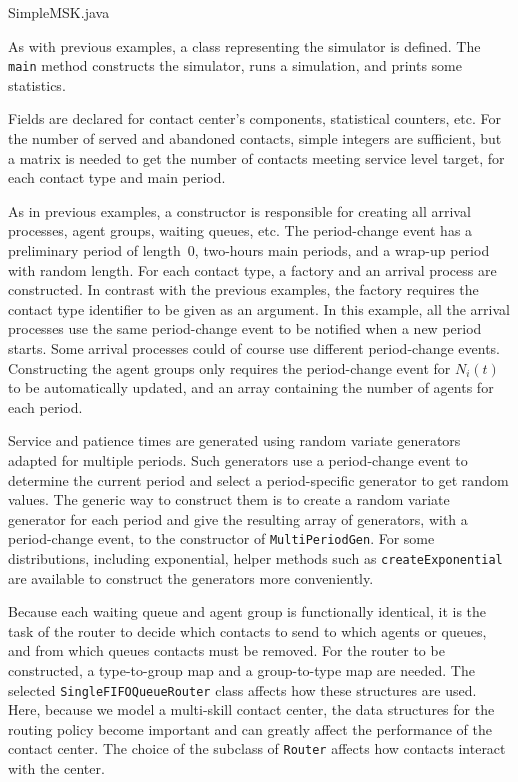 
{SimpleMSK.java}

As with previous examples, a class representing the simulator is
defined.  The \texttt{main} method constructs the simulator, runs a
simulation, and prints some statistics.

Fields are declared for contact center's components, statistical
counters, etc.
For the number of served and
abandoned contacts, simple integers are sufficient,
but a matrix is needed to get the number of contacts meeting service
level target, for each contact type and main period.

As in previous examples, a constructor is responsible for creating all
arrival processes, agent groups, waiting queues, etc.
The period-change event has a preliminary period of length~0,
two-hours main periods, and a wrap-up period with
random length.
For each contact type, a factory and an arrival process are
constructed.  In contrast with the previous examples, the
factory requires the contact type identifier to be given as an
argument.  In this example,
all the arrival processes use the same period-change event to be
notified when a new period starts.  Some arrival processes could of
course use different period-change events.
Constructing the agent groups only
requires the period-change event for $N_i(t)$ to be automatically updated,
and an array containing the number of agents for each period.

Service and patience times are generated using
random variate generators adapted for multiple periods.  Such
generators use a
period-change event to determine the current period and select a
period-specific generator to get random values.  The generic way to
construct them is to create a random variate generator for each
period and give the resulting array of generators, with a
period-change event, to the
constructor of \texttt{Multi\-Period\-Gen}.  For some distributions,
including exponential,
helper methods such as \texttt{create\-Exponential}
are available to construct the generators more
conveniently.

Because each waiting queue and agent group is
functionally identical, it is the task of the router to decide which contacts to
send to which agents or
queues, and from which queues contacts must be removed.
For the router to be constructed, a type-to-group map and a
group-to-type map are needed.  The selected
\texttt{Single\-FIFO\-Queue\-Router} class affects how these
structures are used.  Here, because we model a multi-skill contact
center, the data structures for the routing policy become important
and can greatly affect the performance of the contact center.
The choice of the subclass of \texttt{Router} affects how
contacts interact with the center.

